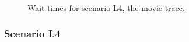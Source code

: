 \documentclass[times, 10pt,twocolumn]{article}
\begin{document}
\begin{figure}[t]
  \centering
   \\
  \caption{Wait times for scenario L4, the movie trace.}
  \label{fig:eve}
\end{figure}

\subsubsection{Scenario L4}
\label{sec:scenario-l4}
\end{document}
